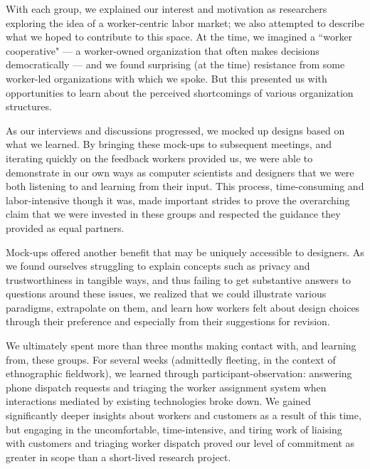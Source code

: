 With each group, we explained our interest and motivation as researchers exploring the idea of a worker-centric labor market;
we also attempted to describe what we hoped to contribute to this space.
At the time, we imagined a ``worker cooperative"
--- a worker-owned organization that often makes decisions democratically ---
and we found surprising (at the time) resistance from some worker-led organizations with which we spoke.
But this presented us with opportunities to learn about the perceived shortcomings of various organization structures.

As our interviews and discussions progressed, we mocked up designs based on what we learned.
By bringing these mock-ups to subsequent meetings, and iterating quickly on the feedback workers provided us,
we were able to demonstrate in our own ways as computer scientists and designers that we were both listening to and learning from their input.
This process, time-consuming and labor-intensive though it was, made important strides to prove the overarching claim that we were invested in these groups and respected the guidance they provided as equal partners.

Mock-ups offered another benefit that may be uniquely accessible to designers.
As we found ourselves struggling to explain concepts such as privacy and trustworthiness in tangible ways, and thus failing to get substantive answers to questions around these issues, we realized that we could illustrate various paradigms, extrapolate on them, and learn how workers felt about design choices through their preference and especially from their suggestions for revision.

We ultimately spent more than three months making contact with, and learning from, these groups.
For several weeks (admittedly fleeting, in the context of ethnographic fieldwork),
we learned through participant-observation:
answering phone dispatch requests and triaging the worker assignment system when interactions mediated by existing technologies broke down.
We gained significantly deeper insights about workers and customers as a result of this time,
but engaging in the uncomfortable, time-intensive, and tiring work of liaising with customers and triaging worker dispatch proved our level of commitment as greater in scope than a short-lived research project.